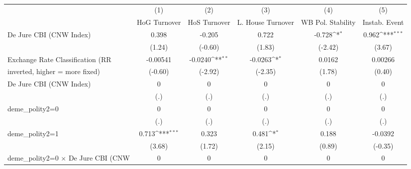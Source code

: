 \begin{table}[htbp]\centering
\def\sym#1{\ifmmode^{#1}\else\(^{#1}\)\fi}
\caption{\label{binarydemcmultIndFEDJ}}
\begin{tabular}{l*{5}{c}}
\toprule
                                        &\multicolumn{1}{c}{(1)}&\multicolumn{1}{c}{(2)}&\multicolumn{1}{c}{(3)}&\multicolumn{1}{c}{(4)}&\multicolumn{1}{c}{(5)}\\
                                        &\multicolumn{1}{c}{HoG Turnover}&\multicolumn{1}{c}{HoS Turnover}&\multicolumn{1}{c}{L. House Turnover}&\multicolumn{1}{c}{WB Pol. Stability}&\multicolumn{1}{c}{Instab. Event}\\
\midrule
De Jure CBI (CNW Index)                 &    0.398         &   -0.205         &    0.722         &   -0.728\sym{*}  &    0.962\sym{***}\\
                                        &   (1.24)         &  (-0.60)         &   (1.83)         &  (-2.42)         &   (3.67)         \\
\addlinespace
Exchange Rate Classification (RR        & -0.00541         &  -0.0240\sym{**} &  -0.0263\sym{*}  &   0.0162         &  0.00266         \\
inverted, higher = more fixed)          &  (-0.60)         &  (-2.92)         &  (-2.35)         &   (1.78)         &   (0.40)         \\
\addlinespace
De Jure CBI (CNW Index)                 &        0         &        0         &        0         &        0         &        0         \\
                                        &      (.)         &      (.)         &      (.)         &      (.)         &      (.)         \\
\addlinespace
deme\_polity2=0                          &        0         &        0         &        0         &        0         &        0         \\
                                        &      (.)         &      (.)         &      (.)         &      (.)         &      (.)         \\
\addlinespace
deme\_polity2=1                          &    0.713\sym{***}&    0.323         &    0.481\sym{*}  &    0.188         &  -0.0392         \\
                                        &   (3.68)         &   (1.72)         &   (2.15)         &   (0.89)         &  (-0.35)         \\
\addlinespace
deme\_polity2=0 $\times$ De Jure CBI (CNW&        0         &        0         &        0         &        0         &        0         \\

\end{tabular}
\end{table}
